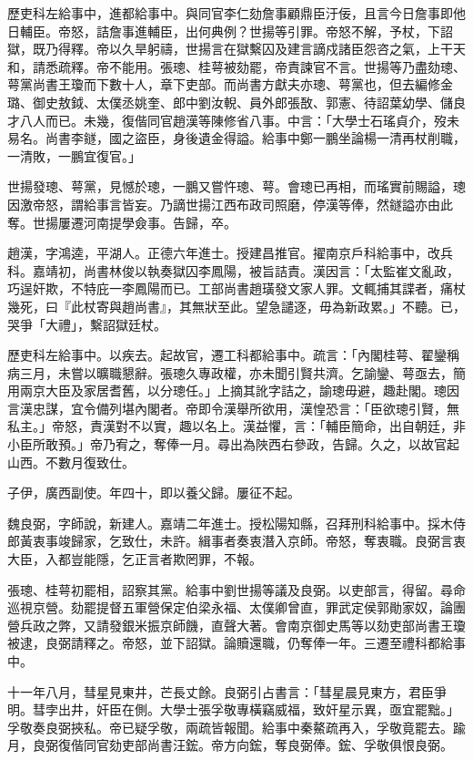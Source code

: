 \begin{pinyinscope}
歷吏科左給事中，進都給事中。與同官李仁劾詹事顧鼎臣汙佞，且言今日詹事即他日輔臣。帝怒，詰詹事進輔臣，出何典例？世揚等引罪。帝怒不解，予杖，下詔獄，既乃得釋。帝以久旱躬禱，世揚言在獄繫囚及建言謫戍諸臣怨咨之氣，上干天和，請悉疏釋。帝不能用。張璁、桂萼被劾罷，帝責諫官不言。世揚等乃盡劾璁、萼黨尚書王瓊而下數十人，章下吏部。而尚書方獻夫亦璁、萼黨也，但去編修金璐、御史敖鉞、太僕丞姚奎、郎中劉汝輗、員外郎張敔、郭憲、待詔葉幼學、儲良才八人而已。未幾，復偕同官趙漢等陳修省八事。中言：「大學士石瑤貞介，歿未易名。尚書李鐩，國之盜臣，身後遺金得謚。給事中鄭一鵬坐論楊一清再杖削職，一清敗，一鵬宜復官。」

世揚發璁、萼黨，見憾於璁，一鵬又嘗忤璁、萼。會璁已再相，而瑤實前賜謚，璁因激帝怒，謂給事言皆妄。乃謫世揚江西布政司照磨，停漢等俸，然鐩謚亦由此奪。世揚屢遷河南提學僉事。告歸，卒。

趙漢，字鴻逵，平湖人。正德六年進士。授建昌推官。擢南京戶科給事中，改兵科。嘉靖初，尚書林俊以執奏獄囚李鳳陽，被旨詰責。漢因言：「太監崔文亂政，巧逞奸欺，不特庇一李鳳陽而已。工部尚書趙璜發文家人罪。文輒捕其諜者，痛杖幾死，曰『此杖寄與趙尚書』，其無狀至此。望急譴逐，毋為新政累。」不聽。已，哭爭「大禮」，繫詔獄廷杖。

歷吏科左給事中。以疾去。起故官，遷工科都給事中。疏言：「內閣桂萼、翟鑾稱病三月，未嘗以曠職懇辭。張璁久專政權，亦未聞引賢共濟。乞諭鑾、萼亟去，簡用兩京大臣及家居耆舊，以分璁任。」上摘其訛字詰之，諭璁毋避，趣赴閣。璁因言漢忠謀，宜令備列堪內閣者。帝即令漢舉所欲用，漢惶恐言：「臣欲璁引賢，無私主。」帝怒，責漢對不以實，趣以名上。漢益懼，言：「輔臣簡命，出自朝廷，非小臣所敢預。」帝乃宥之，奪俸一月。尋出為陜西右參政，告歸。久之，以故官起山西。不數月復致仕。

子伊，廣西副使。年四十，即以養父歸。屢征不起。

魏良弼，字師說，新建人。嘉靖二年進士。授松陽知縣，召拜刑科給事中。採木侍郎黃衷事竣歸家，乞致仕，未許。緝事者奏衷潛入京師。帝怒，奪衷職。良弼言衷大臣，入都豈能隱，乞正言者欺罔罪，不報。

張璁、桂萼初罷相，詔察其黨。給事中劉世揚等議及良弼。以吏部言，得留。尋命巡視京營。劾罷提督五軍營保定伯梁永福、太僕卿曾直，罪武定侯郭勛家奴，論團營兵政之弊，又請發銀米振京師饑，直聲大著。會南京御史馬等以劾吏部尚書王瓊被逮，良弼請釋之。帝怒，並下詔獄。論贖還職，仍奪俸一年。三遷至禮科都給事中。

十一年八月，彗星見東井，芒長丈餘。良弼引占書言：「彗星晨見東方，君臣爭明。彗孛出井，奸臣在側。大學士張孚敬專橫竊威福，致奸星示異，亟宜罷黜。」孚敬奏良弼挾私。帝已疑孚敬，兩疏皆報聞。給事中秦鰲疏再入，孚敬竟罷去。踰月，良弼復偕同官劾吏部尚書汪鋐。帝方向鋐，奪良弼俸。鋐、孚敬俱恨良弼。


\end{pinyinscope}
